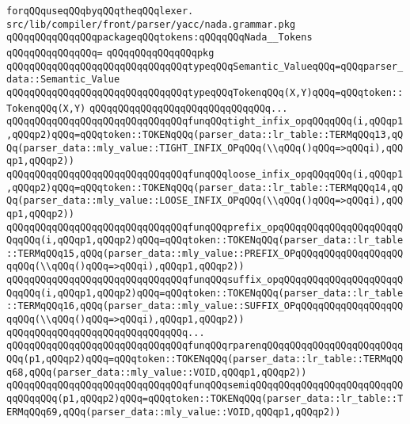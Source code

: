 \verb|forqQQquseqQQqbyqQQqtheqQQqlexer.|\newline
\newline
\verb|src/lib/compiler/front/parser/yacc/nada.grammar.pkg|\newline
\verb|qQQqqQQqqQQqqQQqpackageqQQqtokens:qQQqqQQqNada__Tokens|\newline
\verb|qQQqqQQqqQQqqQQq=|\newline
\verb|qQQqqQQqqQQqqQQqpkg|\newline
\verb|qQQqqQQqqQQqqQQqqQQqqQQqqQQqqQQqtypeqQQqSemantic_ValueqQQq=qQQqparser_data::Semantic_Value|\newline
\verb|qQQqqQQqqQQqqQQqqQQqqQQqqQQqqQQqtypeqQQqTokenqQQq(X,Y)qQQq=qQQqtoken::TokenqQQq(X,Y)|\newline
\verb|qQQqqQQqqQQqqQQqqQQqqQQqqQQqqQQq...|\newline
\verb|qQQqqQQqqQQqqQQqqQQqqQQqqQQqqQQqfunqQQqtight_infix_opqQQqqQQq(i,qQQqp1,qQQqp2)qQQq=qQQqtoken::TOKENqQQq(parser_data::lr_table::TERMqQQq13,qQQq(parser_data::mly_value::TIGHT_INFIX_OPqQQq(\\qQQq()qQQq=>qQQqi),qQQqp1,qQQqp2))|\newline
\verb|qQQqqQQqqQQqqQQqqQQqqQQqqQQqqQQqfunqQQqloose_infix_opqQQqqQQq(i,qQQqp1,qQQqp2)qQQq=qQQqtoken::TOKENqQQq(parser_data::lr_table::TERMqQQq14,qQQq(parser_data::mly_value::LOOSE_INFIX_OPqQQq(\\qQQq()qQQq=>qQQqi),qQQqp1,qQQqp2))|\newline
\verb|qQQqqQQqqQQqqQQqqQQqqQQqqQQqqQQqfunqQQqprefix_opqQQqqQQqqQQqqQQqqQQqqQQqqQQq(i,qQQqp1,qQQqp2)qQQq=qQQqtoken::TOKENqQQq(parser_data::lr_table::TERMqQQq15,qQQq(parser_data::mly_value::PREFIX_OPqQQqqQQqqQQqqQQqqQQqqQQq(\\qQQq()qQQq=>qQQqi),qQQqp1,qQQqp2))|\newline
\verb|qQQqqQQqqQQqqQQqqQQqqQQqqQQqqQQqfunqQQqsuffix_opqQQqqQQqqQQqqQQqqQQqqQQqqQQq(i,qQQqp1,qQQqp2)qQQq=qQQqtoken::TOKENqQQq(parser_data::lr_table::TERMqQQq16,qQQq(parser_data::mly_value::SUFFIX_OPqQQqqQQqqQQqqQQqqQQqqQQq(\\qQQq()qQQq=>qQQqi),qQQqp1,qQQqp2))|\newline
\verb|qQQqqQQqqQQqqQQqqQQqqQQqqQQqqQQq...|\newline
\verb|qQQqqQQqqQQqqQQqqQQqqQQqqQQqqQQqfunqQQqrparenqQQqqQQqqQQqqQQqqQQqqQQqqQQq(p1,qQQqp2)qQQq=qQQqtoken::TOKENqQQq(parser_data::lr_table::TERMqQQq68,qQQq(parser_data::mly_value::VOID,qQQqp1,qQQqp2))|\newline
\verb|qQQqqQQqqQQqqQQqqQQqqQQqqQQqqQQqfunqQQqsemiqQQqqQQqqQQqqQQqqQQqqQQqqQQqqQQqqQQq(p1,qQQqp2)qQQq=qQQqtoken::TOKENqQQq(parser_data::lr_table::TERMqQQq69,qQQq(parser_data::mly_value::VOID,qQQqp1,qQQqp2))|\newline
